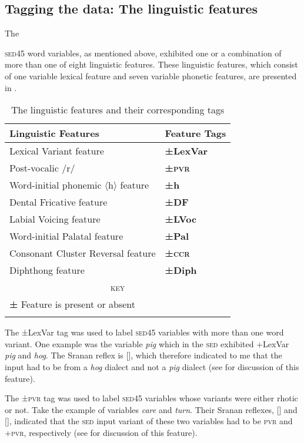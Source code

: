 \subsection{Tagging the data: The linguistic features} \label{3.3.2}
The {\textsc{sed45} word variables, as mentioned above, exhibited one or a combination of more than one of eight linguistic features. These linguistic features, which consist of one variable lexical feature and seven variable phonetic features, are presented in .

\begin{table}
\begin{tabular}{ll}
\lsptoprule
Linguistic Features & Feature Tags\\
\midrule
Lexical Variant feature &  \textbf{±LexVar}\\  
Post-vocalic /r/ & \textbf{±\textsc{pvr}}  \\  
Word-initial phonemic $\langle$h$\rangle$ feature &\textbf{±h}  \\  
Dental Fricative feature & \textbf{±DF}  \\  
Labial Voicing feature & \textbf{±LVoc}  \\  
Word-initial Palatal feature & \textbf{±Pal}  \\  
Consonant Cluster Reversal feature & \textbf{±\textsc{ccr} } \\  
Diphthong feature & \textbf{±Diph } \\  
\midrule
\multicolumn{2}{c}{\textsc{key}} \\\midrule
\textbf{±}  Feature is present or absent \\
\lspbottomrule 
\end{tabular}
\caption{The linguistic features and their corresponding tags}
\label{Table 3.2}
\end{table}

The {±LexVar} tag was used to label \textsc{sed45} variables with more than one word variant. One example was the variable \emph{pig} which in the \textsc{sed} exhibited +LexVar \emph{pig}  and \emph{hog}. The Sranan reflex is [], which therefore indicated to me that the input had to be from a \emph{hog} dialect and not a \emph{pig}  dialect (see  for discussion of this feature). 

The {±\textsc{pvr}} tag was used to label \textsc{sed45} variables whose variants were either rhotic or not. Take the example of variables \emph{care} and \emph{turn}. Their Sranan reflexes, [] and [], indicated that the \textsc{sed} input variant of these two variables had to be \textminus\textsc{pvr} and +\textsc{pvr}, respectively (see  for discussion of this feature).

}
